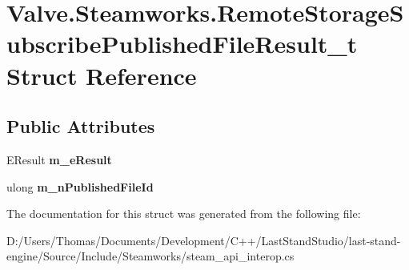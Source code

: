 \hypertarget{structValve_1_1Steamworks_1_1RemoteStorageSubscribePublishedFileResult__t}{}\section{Valve.\+Steamworks.\+Remote\+Storage\+Subscribe\+Published\+File\+Result\+\_\+t Struct Reference}
\label{structValve_1_1Steamworks_1_1RemoteStorageSubscribePublishedFileResult__t}
\subsection*{Public Attributes}
\begin{DoxyCompactItemize}
\item 
\hypertarget{structValve_1_1Steamworks_1_1RemoteStorageSubscribePublishedFileResult__t_ae7b3c0ec2a80676dce0f015a2aacf2cb}{}E\+Result {\bfseries m\+\_\+e\+Result}\label{structValve_1_1Steamworks_1_1RemoteStorageSubscribePublishedFileResult__t_ae7b3c0ec2a80676dce0f015a2aacf2cb}

\item 
\hypertarget{structValve_1_1Steamworks_1_1RemoteStorageSubscribePublishedFileResult__t_a25b0857c57ace027fc67692ff9164d9e}{}ulong {\bfseries m\+\_\+n\+Published\+File\+Id}\label{structValve_1_1Steamworks_1_1RemoteStorageSubscribePublishedFileResult__t_a25b0857c57ace027fc67692ff9164d9e}

\end{DoxyCompactItemize}


The documentation for this struct was generated from the following file\+:\begin{DoxyCompactItemize}
\item 
D\+:/\+Users/\+Thomas/\+Documents/\+Development/\+C++/\+Last\+Stand\+Studio/last-\/stand-\/engine/\+Source/\+Include/\+Steamworks/steam\+\_\+api\+\_\+interop.\+cs\end{DoxyCompactItemize}
